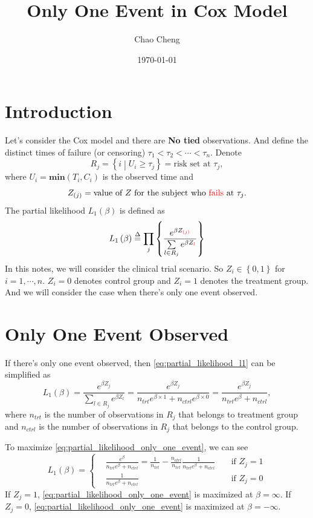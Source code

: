 \documentclass[a4paper,12pt]{article}
\title{Only One Event in Cox Model}
\author{Chao Cheng}
\date{\today}
\begin{document}
\maketitle
\tableofcontents{}

\section{Introduction}
\label{sec:introduction}

Let's consider the Cox model and there are \textbf{No tied} observations. And define the distinct times of failure (or censoring) $\tau_1 < \tau_2 < \cdots < \tau_n$. Denote
\[
  R_j = \left\{i\middle|U_i \geq \tau_j\right\} = \text{risk set at $\tau_j$}, 
\]
where $U_i = \mathbf{min}\left(T_i, C_i\right)$ is the observed time and
\[
  Z_{(j)} = \text{value of $Z$ for the subject who {\color{red}fails} at $\tau_j$}. 
\]
The partial likelihood $L_1(\beta)$ is defined as
\begin{equation}
  \label{eq:partial_likelihood_l1}
  L_1\left(\beta\right)
  \overset{\Delta}{=}
  \prod_j\left\{
    \frac{e^{\beta Z_{{\color{red}\left(j\right)}}}}{
      \sum\limits_{l\in R_{j}}e^{\beta Z_{{\color{red}l}}}
    }
  \right\}
\end{equation}
In this notes, we will consider the clinical trial scenario. So $Z_i\in\left\{0, 1\right\}$ for $i = 1, \cdots, n$. $Z_i = 0$ denotes control group and $Z_i = 1$ denotes the treatment group. And we will consider the case when there's only one event observed.

\section{Only One Event Observed}
\label{sec:only-one-event}

If there's only one event observed, then \eqref{eq:partial_likelihood_l1} can be simplified as
\begin{equation}
  \label{eq:partial_likelihood_only_one_event}
  L_1\left(\beta\right)
  = \frac{e^{\beta Z_j}}{\sum\limits_{l\in R_j}e^{\beta Z_l}}
  = \frac{e^{\beta Z_j}}{n_{trt}e^{\beta\times 1} + n_{ctrl}e^{\beta \times 0}}
  = \frac{e^{\beta Z_j}}{n_{trt}e^{\beta} + n_{ctrl}}, 
\end{equation}
where $n_{trt}$ is the number of observations in $R_j$ that belongs to treatment group and $n_{ctrl}$ is the number of observations in $R_j$ that belongs to the control group. 
\par
To maximize \eqref{eq:partial_likelihood_only_one_event}, we can see
\[
  L_1\left(\beta\right)
  = \left\{
    \begin{aligned}
      & \frac{e^{\beta}}{n_{trt}e^{\beta} + n_{ctrl}}
        = \frac{1}{n_{trt}}
        - \frac{n_{ctrl}}{n_{trt}}\frac{1}{n_{trt}e^{\beta} + n_{ctrl}}
      && \;\text{if } Z_j = 1 \\
      & \frac{1}{n_{trt}e^{\beta} + n_{ctrl}}
      && \;\text{if } Z_j = 0
    \end{aligned}
  \right.
\]
If $Z_j = 1$, \eqref{eq:partial_likelihood_only_one_event} is maximized at $\beta = \infty$. If $Z_j = 0$, \eqref{eq:partial_likelihood_only_one_event} is maximized at $\beta = -\infty$.
\end{document}
